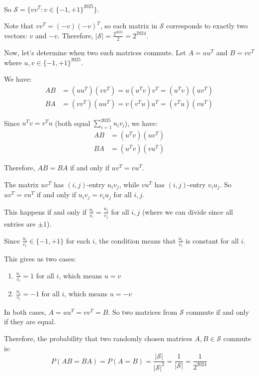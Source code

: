 \documentclass[12pt,a4paper]{article}
\theoremstyle{definition}
\begin{document}
    So $\mathcal{S} = \{vv^T : v \in \{-1, +1\}^{2025}\}$.

    Note that $vv^T = (-v)(-v)^T$, so each matrix in $\mathcal{S}$ corresponds to exactly two vectors: $v$ and $-v$. Therefore, $|\mathcal{S}| = \frac{2^{2025}}{2} = 2^{2024}$.

    Now, let's determine when two such matrices commute. Let $A = uu^T$ and $B = vv^T$ where $u, v \in \{-1, +1\}^{2025}$.

    We have:
    \begin{align}
        AB &= (uu^T)(vv^T) = u(u^T v)v^T = (u^T v)(uv^T)\\
        BA &= (vv^T)(uu^T) = v(v^T u)u^T = (v^T u)(vu^T)
    \end{align}

    Since $u^T v = v^T u$ (both equal $\sum_{i=1}^{2025} u_i v_i$), we have:
    \begin{align}
        AB &= (u^T v)(uv^T)\\
        BA &= (u^T v)(vu^T)
    \end{align}

    Therefore, $AB = BA$ if and only if $uv^T = vu^T$.

    The matrix $uv^T$ has $(i,j)$-entry $u_i v_j$, while $vu^T$ has $(i,j)$-entry $v_i u_j$. So $uv^T = vu^T$ if and only if $u_i v_j = v_i u_j$ for all $i, j$.

    This happens if and only if $\frac{u_i}{v_i} = \frac{u_j}{v_j}$ for all $i, j$ (where we can divide since all entries are $\pm 1$).

    Since $\frac{u_i}{v_i} \in \{-1, +1\}$ for each $i$, the condition means that $\frac{u_i}{v_i}$ is constant for all $i$.

    This gives us two cases:
    \begin{enumerate}
        \item $\frac{u_i}{v_i} = 1$ for all $i$, which means $u = v$
        \item $\frac{u_i}{v_i} = -1$ for all $i$, which means $u = -v$
    \end{enumerate}

    In both cases, $A = uu^T = vv^T = B$. So two matrices from $\mathcal{S}$ commute if and only if they are equal.

    Therefore, the probability that two randomly chosen matrices $A, B \in \mathcal{S}$ commute is:
    $$P(AB = BA) = P(A = B) = \frac{|\mathcal{S}|}{|\mathcal{S}|^2} = \frac{1}{|\mathcal{S}|} = \frac{1}{2^{2024}}$$
\end{document}
